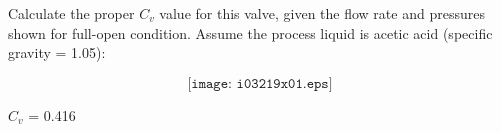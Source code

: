 

Calculate the proper $C_v$ value for this valve, given the flow rate and pressures shown for full-open condition.  Assume the process liquid is acetic acid (specific gravity = 1.05):

$$\texttt{[image: i03219x01.eps]}$$







$C_v$ = 0.416
 











